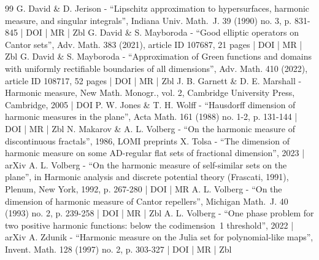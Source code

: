 \documentclass[10pt]{amsart}
\numberwithin{equation}{section}
\theoremstyle{plain}
\theoremstyle{definition}
\begin{document}
\begin{thebibliography}{99}
G. David \& D. Jerison - “Lipschitz approximation to hypersurfaces, harmonic measure, and singular integrals”, Indiana Univ. Math. J. 39 (1990) no. 3, p. 831-845 | DOI | MR | Zbl
G. David \& S. Mayboroda - “Good elliptic operators on Cantor sets”, Adv. Math. 383 (2021), article ID 107687, 21 pages | DOI | MR | Zbl
G. David \& S. Mayboroda - “Approximation of Green functions and domains with uniformly rectifiable boundaries of all dimensions”, Adv. Math. 410 (2022), article ID 108717, 52 pages | DOI | MR | Zbl
J. B. Garnett \& D. E. Marshall - Harmonic measure, New Math. Monogr., vol. 2, Cambridge University Press, Cambridge, 2005 | DOI
P. W. Jones \& T. H. Wolff - “Hausdorff dimension of harmonic measures in the plane”, Acta Math. 161 (1988) no. 1-2, p. 131-144 | DOI | MR | Zbl
N. Makarov \& A. L. Volberg - “On the harmonic measure of discontinuous fractals”, 1986, LOMI preprints
X. Tolsa - “The dimension of harmonic measure on some AD-regular flat sets of fractional dimension”, 2023 | arXiv
A. L. Volberg - “On the harmonic measure of self-similar sets on the plane”, in Harmonic analysis and discrete potential theory (Frascati, 1991), Plenum, New York, 1992, p. 267-280 | DOI | MR
A. L. Volberg - “On the dimension of harmonic measure of Cantor repellers”, Michigan Math. J. 40 (1993) no. 2, p. 239-258 | DOI | MR | Zbl
A. L. Volberg - “One phase problem for two positive harmonic functions: below the codimension 1 threshold”, 2022 | arXiv
A. Zdunik - “Harmonic measure on the Julia set for polynomial-like maps”, Invent. Math. 128 (1997) no. 2, p. 303-327 | DOI | MR | Zbl
\end{thebibliography}
\end{document}
